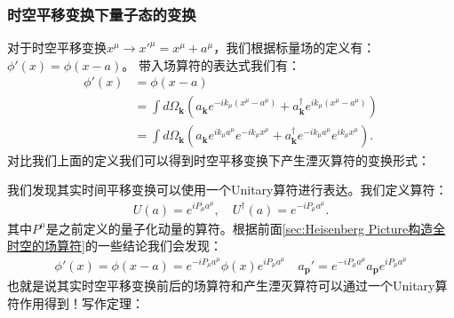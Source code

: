 \subsubsection{时空平移变换下量子态的变换}


对于时空平移变换$ x^\mu \to x'^\mu = x^\mu + a^\mu $，我们根据标量场的定义有：$ \phi'(x) =
\phi(x - a) $。 带入场算符的表达式我们有：
\begin{align}
  \phi'(x) &= \phi(x - a) \\
  &= \int d\Omega_\mathbf{k}\left(a_\mathbf{k}e^{-ik_\mu (x^\mu -
  a^\mu)} + a_\mathbf{k}^\dagger e^{ik_\mu (x^\mu - a^\mu)}\right) \\
  &= \int d\Omega_\mathbf{k}\left(a_\mathbf{k}e^{ik_\mu
    a^\mu}e^{-ik_\mu x^\mu} + a_\mathbf{k}^\dagger e^{-ik_\mu
  a^\mu}e^{ik_\mu x^\mu}\right).
\end{align}
对比我们上面的定义我们可以得到时空平移变换下产生湮灭算符的变换形式：

\bigskip
{}

我们发现其实时间平移变换可以使用一个Unitary算符进行表达。我们定义算符：
\begin{align}
  U(a) = e^{iP_\mu a^\mu}, \quad U^\dagger(a) = e^{-iP_\mu a^\mu}.
\end{align}
其中$ P^\mu $是之前定义的量子化动量的算符。根据前面\cref{sec:Heisenberg Picture构造全时空的场算符}的一些结论我们会发现：
\begin{align}
  \phi'(x) = \phi(x-a) = e^{-iP_\mu a^\mu }\phi(x)e^{iP_\mu a^\mu}
  \quad a_{\mathbf{p}}' = e^{-iP_\mu a^\mu } a_{\mathbf{p}} e^{iP_\mu a^\mu}
\end{align}
也就是说其实时空平移变换前后的场算符和产生湮灭算符可以通过一个Unitary算符作用得到！写作定理：

